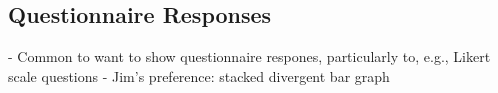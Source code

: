 \subsection{Questionnaire Responses}

- Common to want to show questionnaire respones, particularly to, e.g., Likert scale questions
- Jim's preference: stacked divergent bar graph

\begin{figure}
\end{figure}
